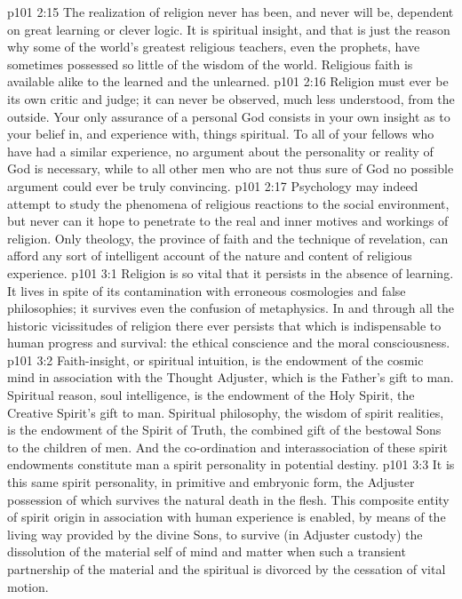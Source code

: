 \pc \vs p101 2:15 The realization of religion never has been, and never will be, dependent on great learning or clever logic. It is spiritual insight, and that is just the reason why some of the world’s greatest religious teachers, even the prophets, have sometimes possessed so little of the wisdom of the world. Religious faith is available alike to the learned and the unlearned.\plusone
\vs p101 2:16 Religion must ever be its own critic and judge; it can never be observed, much less understood, from the outside. Your only assurance of a personal God consists in your own insight as to your belief in, and experience with, things spiritual. To all of your fellows who have had a similar experience, no argument about the personality or reality of God is necessary, while to all other men who are not thus sure of God no possible argument could ever be truly convincing.
\vs p101 2:17 Psychology may indeed attempt to study the phenomena of religious reactions to the social environment, but never can it hope to penetrate to the real and inner motives and workings of religion. Only theology, the province of faith and the technique of revelation, can afford any sort of intelligent account of the nature and content of religious experience.
\vs p101 3:1 Religion is so vital that it persists in the absence of learning. It lives in spite of its contamination with erroneous cosmologies and false philosophies; it survives even the confusion of metaphysics. In and through all the historic vicissitudes of religion there ever persists that which is indispensable to human progress and survival: the ethical conscience and the moral consciousness.
\vs p101 3:2 Faith\hyp{}insight, or spiritual intuition, is the endowment of the cosmic mind in association with the Thought Adjuster, which is the Father’s gift to man. Spiritual reason, soul intelligence, is the endowment of the Holy Spirit, the Creative Spirit’s gift to man. Spiritual philosophy, the wisdom of spirit realities, is the endowment of the Spirit of Truth, the combined gift of the bestowal Sons to the children of men. And the co\hyp{}ordination and interassociation of these spirit endowments constitute man a spirit personality in potential destiny.
\vs p101 3:3 It is this same spirit personality, in primitive and embryonic form, the Adjuster possession of which survives the natural death in the flesh. This composite entity of spirit origin in association with human experience is enabled, by means of the living way provided by the divine Sons, to survive (in Adjuster custody) the dissolution of the material self of mind and matter when such a transient partnership of the material and the spiritual is divorced by the cessation of vital motion.
